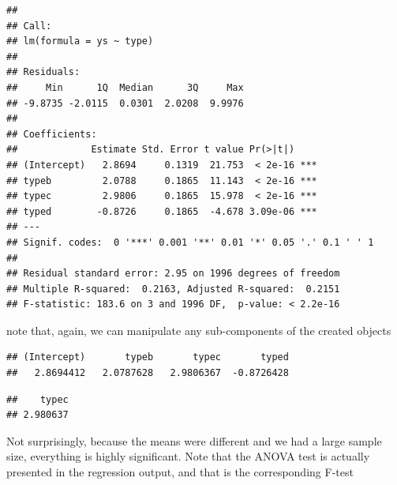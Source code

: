 \documentclass[
]{book}
\newenvironment{Shaded}{\begin{snugshade}}{\end{snugshade}}
\newcommand{\CommentTok}[1]{\textcolor[rgb]{0.56,0.35,0.01}{\textit{#1}}}
\newcommand{\DecValTok}[1]{\textcolor[rgb]{0.00,0.00,0.81}{#1}}
\newcommand{\KeywordTok}[1]{\textcolor[rgb]{0.13,0.29,0.53}{\textbf{#1}}}
\newcommand{\NormalTok}[1]{#1}
\newcommand{\OperatorTok}[1]{\textcolor[rgb]{0.81,0.36,0.00}{\textbf{#1}}}
\begin{document}
\begin{verbatim}
## 
## Call:
## lm(formula = ys ~ type)
## 
## Residuals:
##     Min      1Q  Median      3Q     Max 
## -9.8735 -2.0115  0.0301  2.0208  9.9976 
## 
## Coefficients:
##             Estimate Std. Error t value Pr(>|t|)    
## (Intercept)   2.8694     0.1319  21.753  < 2e-16 ***
## typeb         2.0788     0.1865  11.143  < 2e-16 ***
## typec         2.9806     0.1865  15.978  < 2e-16 ***
## typed        -0.8726     0.1865  -4.678 3.09e-06 ***
## ---
## Signif. codes:  0 '***' 0.001 '**' 0.01 '*' 0.05 '.' 0.1 ' ' 1
## 
## Residual standard error: 2.95 on 1996 degrees of freedom
## Multiple R-squared:  0.2163,	Adjusted R-squared:  0.2151 
## F-statistic: 183.6 on 3 and 1996 DF,  p-value: < 2.2e-16
\end{verbatim}

note that, again, we can manipulate any sub-components of the created objects

\begin{Shaded}
\end{Shaded}

\begin{verbatim}
## (Intercept)       typeb       typec       typed 
##   2.8694412   2.0787628   2.9806367  -0.8726428
\end{verbatim}

\begin{Shaded}
\end{Shaded}

\begin{verbatim}
##    typec 
## 2.980637
\end{verbatim}

Not surprisingly, because the means were different and we had a large sample size, everything is highly significant. Note that the ANOVA test is actually presented in the regression output, and that is the corresponding F-test

\begin{Shaded}
\end{Shaded}
\end{document}
